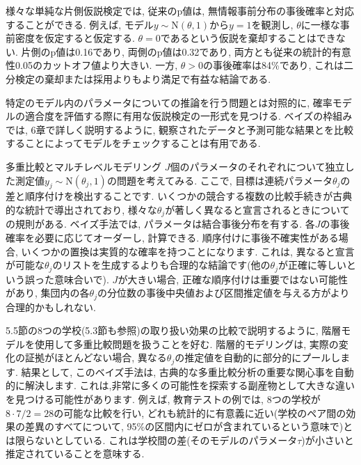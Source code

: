 \documentclass[10pt,dvipdfmx,a4]{beamer}
\begin{document}

\begin{frame}
様々な単純な片側仮説検定では, 従来のp値は, 無情報事前分布の事後確率と対応することができる.
例えば, モデル$y\sim\text{N}(\theta, 1)$から$y=1$を観測し, $\theta$に一様な事前密度を仮定すると仮定する.
$\theta=0$であるという仮説を棄却することはできない.
片側のp値は0.16であり, 両側のp値は0.32であり, 両方とも従来の統計的有意性0.05のカットオフ値より大きい.
一方, $\theta>0$の事後確率は84\%であり, これは二分検定の棄却または採用よりもより満足で有益な結論である.

特定のモデル内のパラメータについての推論を行う問題とは対照的に, 確率モデルの適合度を評価する際に有用な仮説検定の一形式を見つける.
ベイズの枠組みでは, 6章で詳しく説明するように, 観察されたデータと予測可能な結果とを比較することによってモデルをチェックすることは有用である.
\end{frame}


\begin{frame}{多重比較とマルチレベルモデリング}
$J$個のパラメータのそれぞれについて独立した測定値$y_j\sim\text{N}(\theta_j, 1)$の問題を考えてみる.
ここで, 目標は連続パラメータ$\theta_j$の差と順序付けを検出することです.
いくつかの競合する複数の比較手続きが古典的な統計で導出されており, 様々な$\theta_j$が著しく異なると宣言されるときについての規則がある.
ベイズ手法では, パラメータは結合事後分布を有する.
各$J$の事後確率を必要に応じてオーダーし, 計算できる.
順序付けに事後不確実性がある場合, いくつかの置換は実質的な確率を持つことになります.
これは, 異なると宣言が可能な$\theta_j$のリストを生成するよりも合理的な結論です(他の$\theta_j$が正確に等しいという誤った意味合いで).
$J$が大きい場合, 正確な順序付けは重要ではない可能性があり, 集団内の各$\theta_j$の分位数の事後中央値および区間推定値を与える方がより合理的かもしれない.
\end{frame}


\begin{frame}
5.5節の8つの学校(5.3節も参照)の取り扱い効果の比較で説明するように, 階層モデルを使用して多重比較問題を扱うことを好む.
階層的モデリングは, 実際の変化の証拠がほとんどない場合, 異なる$\theta_j$の推定値を自動的に部分的にプールします.
結果として, このベイズ手法は, 古典的な多重比較分析の重要な関心事を自動的に解決します.
これは,非常に多くの可能性を探索する副産物として大きな違いを見つける可能性があります.
例えば, 教育テストの例では, 8つの学校が$8\cdot 7/2=28$の可能な比較を行い, どれも統計的に有意義に近い(学校のペア間の効果の差異のすべてについて, 95\%の区間内にゼロが含まれているという意味で)とは限らないとしている.
これは学校間の差(そのモデルのパラメータ$\tau$)が小さいと推定されていることを意味する.

\end{frame}
\end{document}
